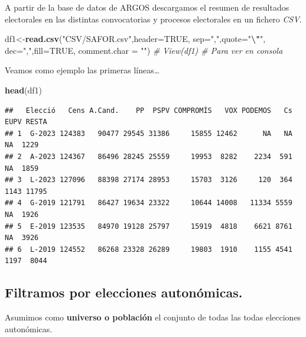 \documentclass[
]{article}
\newenvironment{Shaded}{\begin{snugshade}}{\end{snugshade}}
\newcommand{\AttributeTok}[1]{\textcolor[rgb]{0.13,0.29,0.53}{#1}}
\newcommand{\CommentTok}[1]{\textcolor[rgb]{0.56,0.35,0.01}{\textit{#1}}}
\newcommand{\ConstantTok}[1]{\textcolor[rgb]{0.56,0.35,0.01}{#1}}
\newcommand{\FunctionTok}[1]{\textcolor[rgb]{0.13,0.29,0.53}{\textbf{#1}}}
\newcommand{\NormalTok}[1]{#1}
\newcommand{\OtherTok}[1]{\textcolor[rgb]{0.56,0.35,0.01}{#1}}
\newcommand{\SpecialCharTok}[1]{\textcolor[rgb]{0.81,0.36,0.00}{\textbf{#1}}}
\newcommand{\StringTok}[1]{\textcolor[rgb]{0.31,0.60,0.02}{#1}}
\begin{document}
A partir de la base de datos de ARGOS descargamos el resumen de
resultados electorales en las distintas convocatorias y procesos
electorales en un fichero \emph{CSV}.

\begin{Shaded}
\begin{Highlighting}[]
\NormalTok{  df1}\OtherTok{\textless{}{-}}\FunctionTok{read.csv}\NormalTok{(}\StringTok{"CSV/SAFOR.csv"}\NormalTok{,}\AttributeTok{header=}\ConstantTok{TRUE}\NormalTok{, }\AttributeTok{sep=}\StringTok{","}\NormalTok{,}\AttributeTok{quote=}\StringTok{"}\SpecialCharTok{\textbackslash{}"}\StringTok{\textquotesingle{}"}\NormalTok{, }\AttributeTok{dec=}\StringTok{","}\NormalTok{,}\AttributeTok{fill=}\ConstantTok{TRUE}\NormalTok{,}
                \AttributeTok{comment.char =} \StringTok{""}\NormalTok{)}
  \CommentTok{\# View(df1) \# Para ver en consola}
\end{Highlighting}
\end{Shaded}

Veamos como ejemplo las primeras líneas\ldots{}

\begin{Shaded}
\begin{Highlighting}[]
\FunctionTok{head}\NormalTok{(df1)}
\end{Highlighting}
\end{Shaded}

\begin{verbatim}
##   Elecció   Cens A.Cand.    PP  PSPV COMPROMÍS   VOX PODEMOS   Cs EUPV RESTA
## 1  G-2023 124383   90477 29545 31386     15855 12462      NA   NA   NA  1229
## 2  A-2023 124367   86496 28245 25559     19953  8282    2234  591   NA  1859
## 3  L-2023 127096   88398 27174 28953     15703  3126     120  364 1143 11795
## 4  G-2019 121791   86427 19634 23322     10644 14008   11334 5559   NA  1926
## 5  E-2019 123535   84970 19128 25797     15919  4818    6621 8761   NA  3926
## 6  L-2019 124552   86268 23328 26289     19803  1910    1155 4541 1197  8044
\end{verbatim}

\hypertarget{filtramos-por-elecciones-autonuxf3micas.}{%
\subsection{Filtramos por elecciones
autonómicas.}\label{filtramos-por-elecciones-autonuxf3micas.}}

Asumimos como \textbf{universo o población} el conjunto de todas las
todas elecciones autonómicas.
\end{document}
